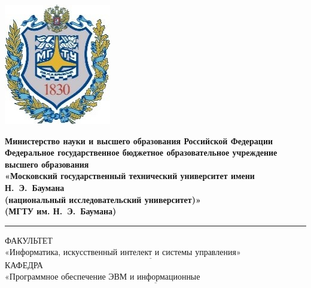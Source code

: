 \begin{titlepage}
	\fontsize{12pt}{12pt}\selectfont
	\noindent \begin{minipage}{0.15\textwidth}
		\includegraphics[width=\linewidth]{img/b_logo.jpg}
	\end{minipage}
	\noindent\begin{minipage}{0.9\textwidth}\centering
		\textbf{Министерство науки и высшего образования Российской Федерации}\\
		\textbf{Федеральное государственное бюджетное образовательное учреждение высшего образования}\\
		\textbf{«Московский государственный технический университет имени Н.~Э.~Баумана}\\
		\textbf{(национальный исследовательский университет)»}\\
		\textbf{(МГТУ им. Н.~Э.~Баумана)}
	\end{minipage}

	\noindent\rule{18cm}{3pt}
	\newline\newline
	\noindent ФАКУЛЬТЕТ $\underline{\text{«Информатика, искусственный интелект и системы управления»~~~~~~~~~~~~~~~~~~~~}}$ \newline\newline
	\noindent КАФЕДРА $\underline{\text{«Программное обеспечение ЭВМ и информационные технологии»~~~~~~~~~~~~~~~~~~~~~~~}}$\newline\newline\newline\newline\newline\newline\newline



\end{titlepage}
